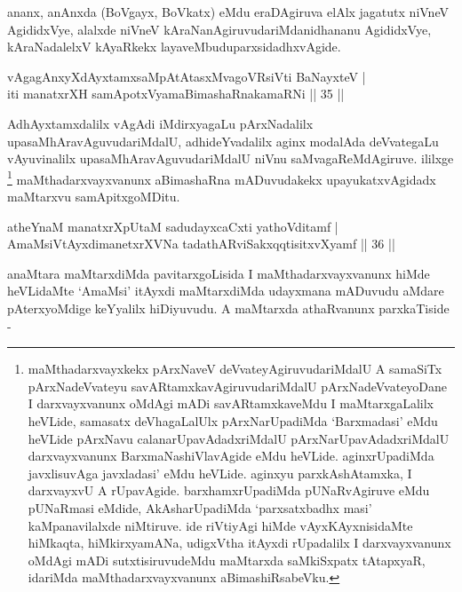 \begin{artha}
ananx, anAnxda (BoVgayx, BoVkatx) eMdu eraDAgiruva elAlx jagatutx niVneV AgididxVye, alalxde niVneV kAraNanAgiruvudariMda\break nidhananu AgididxVye, kAraNadalelxV kAyaRkekx layaveMbudu\break parxsidadhxvAgide.
\end{artha}

\begin{shl}
vAgagAnxyXdAyxtamxsaMpAtAtasxMvagoVR\s siVti BaNayxteV | \\
iti manatxrXH samApotxV\s yamaBimashaRnakamaRNi \hfill|| 35 || 
\end{shl}

\begin{artha}
AdhAyxtamxdalilx vAgAdi iMdirxyagaLu pArxNadalilx upasaMhAravAguvudariMdalU, adhideYvadalilx aginx modalAda deVvategaLu vAyuvinalilx upasaMhAravAguvudariMdalU niVnu saMvagaR\break eMdAgiruve. ililxge \footnote{maMthadarxvayxkekx pArxNaveV deVvateyAgiruvudariMdalU A samaSiTx pArxNadeVvateyu savARtamxkavAgiruvudariMdalU pArxNadeVvateyoDane I darxvayxvanunx oMdAgi mADi savARtamxkaveMdu I maMtarxgaLalilx heVLide, samasatx deVhagaLalUlx pArxNarUpadiMda `Barxmadasi' eMdu heVLide pArxNavu calanarUpavAdadxriMdalU pArxNarUpavAdadxriMdalU darxvayxvanunx BarxmaNashiVlavAgide eMdu heVLide. aginxrUpadiMda javxlisuvAga javxladasi' eMdu heVLide. aginxyu parxkAshAtamxka, I darxvayxvU A rUpavAgide. barxhamxrUpadiMda pUNaRvAgiruve eMdu pUNaRmasi eMdide, AkAsharUpadiMda `parxsatxbadhx masi' kaMpanavilalxde niMtiruve. ide riVtiyAgi hiMde vAyxKAyxnisidaMte hiMkaqta, hiMkirxyamANa, udigxVtha itAyxdi rUpadalilx I darxvayxvanunx oMdAgi mADi sutxtisiruvudeMdu maMtarxda saMkiSxpatx tAtapxyaR, idariMda maMthadarxvayxvanunx aBimashiRsabeVku.} maMthadarxvayxvanunx aBimashaRna mADuvudakekx upayukatxvAgidadx maMtarxvu samApitxgoMDitu.
\end{artha}


\begin{shl}
atheYnaM manatxrXpUtaM sadudayxcaCxti yathoVditamf | \\
AmaMsiVtAyxdimanetxrXVNa tadathARviSakxqqtisitxvXyamf \hfill|| 36 || 
\end{shl}

\begin{artha}
anaMtara maMtarxdiMda pavitarxgoLisida I maMthadarxvayxvanunx hiMde heVLidaMte `AmaMsi' itAyxdi maMtarxdiMda udayxmana mADuvudu aMdare pAterxyoMdige keYyalilx hiDiyuvudu. A maMtarxda athaRvanunx parxkaTiside - 
\end{artha}


